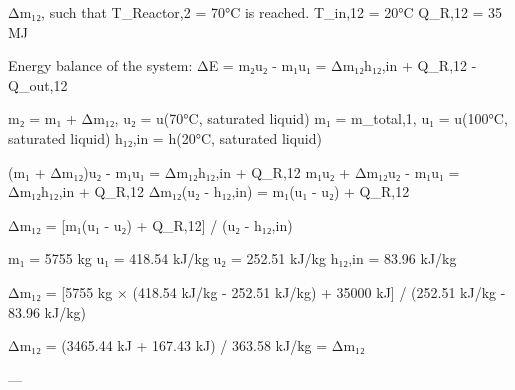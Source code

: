 Δm₁₂, such that T_Reactor,2 = 70°C is reached.  
T_in,12 = 20°C  
Q_R,12 = 35 MJ  

Energy balance of the system:  
ΔE = m₂u₂ - m₁u₁ = Δm₁₂h₁₂,in + Q_R,12 - Q_out,12  

m₂ = m₁ + Δm₁₂, u₂ = u(70°C, saturated liquid)  
m₁ = m_total,1, u₁ = u(100°C, saturated liquid)  
h₁₂,in = h(20°C, saturated liquid)  

(m₁ + Δm₁₂)u₂ - m₁u₁ = Δm₁₂h₁₂,in + Q_R,12  
m₁u₂ + Δm₁₂u₂ - m₁u₁ = Δm₁₂h₁₂,in + Q_R,12  
Δm₁₂(u₂ - h₁₂,in) = m₁(u₁ - u₂) + Q_R,12  

Δm₁₂ = [m₁(u₁ - u₂) + Q_R,12] / (u₂ - h₁₂,in)  

m₁ = 5755 kg  
u₁ = 418.54 kJ/kg  
u₂ = 252.51 kJ/kg  
h₁₂,in = 83.96 kJ/kg  

Δm₁₂ = [5755 kg × (418.54 kJ/kg - 252.51 kJ/kg) + 35000 kJ] / (252.51 kJ/kg - 83.96 kJ/kg)  

Δm₁₂ = (3465.44 kJ + 167.43 kJ) / 363.58 kJ/kg = Δm₁₂  

---